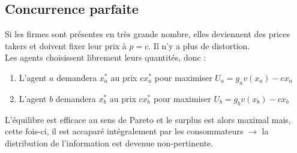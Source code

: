 \subsection{Concurrence parfaite}

Si les firmes sont présentes en très grande nombre, elles deviennent des prices takers et doivent fixer leur prix à $p = c$. Il n'y a plus de distortion.\\
Les agents choisissent librement leurs quantités, donc :
\begin{enumerate}
\item L'agent $a$ demandera $x_a^*$ au prix $cx_a^*$ pour maximiser $U_a = g_av(x_a) - cx_a$
\item L'agent $b$ demandera $x_b^*$ au prix $cx_b^*$ pour maximiser $U_b = g_bv(x_b) - cx_b$
\end{enumerate}

L'équilibre est efficace au sens de Pareto et le surplus est alors maximal mais, cette fois-ci, il est accaparé intégralement par les consommateurs $\rightarrow$ la distribution de l'information est devenue non-pertinente.
